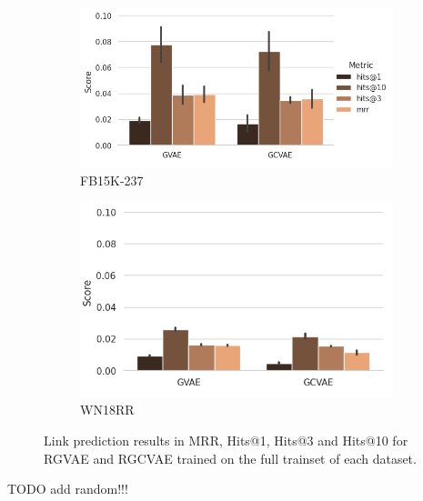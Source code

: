

 \begin{figure}[H]
  \centering
  \begin{subfigure}{.5\textwidth}
    \left
    \includegraphics[height=.5\textwidth, keepaspectratio]{graphs/plots/lp_fb.png}
    \caption{FB15K-237}
    \label{fig5:lpfb}
  \end{subfigure}%
  \begin{subfigure}{.5\textwidth}
    \right
    \includegraphics[height=.5\textwidth]{graphs/plots/lp_wn_wol.png}
    \caption{WN18RR}
    \label{fig5:lpwn}
  \end{subfigure}
  \caption{Link prediction results in MRR, Hits@1, Hits@3 and Hits@10 for RGVAE and RGCVAE trained on the full trainset of each dataset.}
  \label{fig5:lp_final}
\end{figure}

TODO add random!!!


